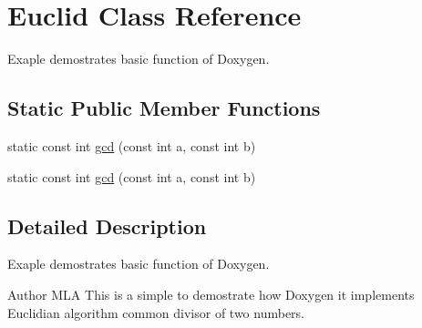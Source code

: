 \hypertarget{classEuclid}{\section{Euclid Class Reference}
\label{classEuclid}
}


Exaple demostrates basic function of Doxygen.  


\subsection*{Static Public Member Functions}
\begin{DoxyCompactItemize}
\item 
static const int \hyperlink{classEuclid_a568dbbb24171a3a52e0a31a2950b31a6}{gcd} (const int a, const int b)
\item 
static const int \hyperlink{classEuclid_a568dbbb24171a3a52e0a31a2950b31a6}{gcd} (const int a, const int b)
\end{DoxyCompactItemize}


\subsection{Detailed Description}
Exaple demostrates basic function of Doxygen. 

\begin{DoxyAuthor}{Author}
M\-L\-A This is a simple to demostrate how Doxygen it implements Euclidian algorithm common divisor of two numbers. 
\end{DoxyAuthor}


